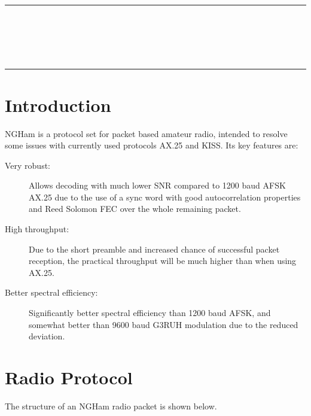 \documentclass[a4paper, english, 12pt, hidelinks]{article}
\newcommand{\HRule}{\rule{\linewidth}{0.5mm}}
\begin{document}
\begin{titlepage}

    \begin{centering}
\vspace*{\fill}
	    {\color{medium-gray}\HRule}
	    \\[0.6cm]
	    \color{dark-gray}
        \\[0.2cm]
        \\[0.2cm]
        \\[0.2cm]
	    {\color{medium-gray}\HRule}
\vspace*{\fill}
    \end{centering}
\end{titlepage}

\tableofcontents
\clearpage

\section{Introduction}
    NGHam is a protocol set for packet based amateur radio, intended to resolve some issues with
    currently used protocols AX.25 and KISS. Its key features are:

    \begin{description}
        \item[Very robust:] Allows decoding with much lower SNR compared to 1200 baud AFSK AX.25 due to the 
        use of a sync word with good autocorrelation properties and Reed Solomon FEC over the whole
        remaining packet.
        \item[High throughput:] Due to the short preamble and increased chance of successful packet reception,
        the practical throughput will be much higher than when using AX.25.
        \item[Better spectral efficiency:] Significantly better spectral efficiency than 1200 baud AFSK, and
        somewhat better than 9600 baud G3RUH modulation due to the reduced deviation.
    \end{description}

	\clearpage

\section{Radio Protocol}
    The structure of an NGHam radio packet is shown below.
\end{document}
